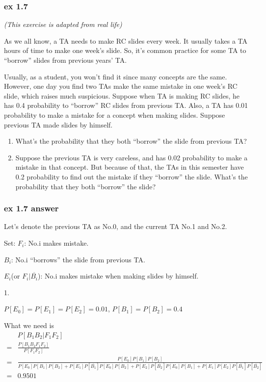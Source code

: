 \documentclass{beamer}
\begin{document}
\begin{frame}
    \frametitle{ex 1.7}
    \textit{(This exercise is adapted from real life)}\par
    As we all know, a TA needs to make RC slides every week. It usually takes a TA hours of time to make one week's slide. So, it's common practice for some TA to ``borrow'' slides from previous years' TA.\par
    Usually, as a student, you won't find it since many concepts are the same. However, one day you find two TAs make the same mistake in one week's RC slide, which raises much suspicious. Suppose when TA is making RC slides, he has 0.4 probability to ``borrow'' RC slides from previous TA. Also, a TA has 0.01 probability to make a mistake for a concept when making slides. Suppose previous TA made slides by himself.\par
    \begin{enumerate}
        \item What's the probability that they both ``borrow'' the slide from previous TA?
        \item Suppose the previous TA is very careless, and has 0.02 probability to make a mistake in that concept. But because of that, the TAs in this semester have 0.2 probability to find out the mistake if they ``borrow'' the slide. What's the probability that they both ``borrow'' the slide?
    \end{enumerate}
\end{frame}

\begin{frame}
    \frametitle{ex 1.7 answer}
    Let's denote the previous TA as No.0, and the current TA No.1 and No.2.\par
    Set: $F_i$: No.i makes mistake.\par
    $B_i$: No.i ``borrows'' the slide from previous TA. \par
    $E_i$(or $F_i|\overline{B_i}$): No.i makes mistake when making slides by himself. \par
    1. \par
    $P[E_0]=P[E_1]=P[E_2]=0.01$, $P[B_1]=P[B_2]=0.4$ \par
    What we need is
    \tiny
    \begin{align*}
         & P[B_1 B_2|F_1 F_2] \\
        =& \frac{P[B_1 B_2 F_1 F_2]}{P[F_1 F_2]}\\
        =& \frac{P[E_0]P[B_1]P[B_2]}{P[E_0]P[B_1]P[B_2]+P[E_1]P[\overline{B_1}]P[E_0]P[B_2]+P[E_2]P[\overline{B_2}]P[E_0]P[B_1]+
        P[E_1]P[E_2]P[\overline{B_1}]P[\overline{B_2}]}\\
        =& 0.9501
    \end{align*}
    

\end{frame}
\end{document}
